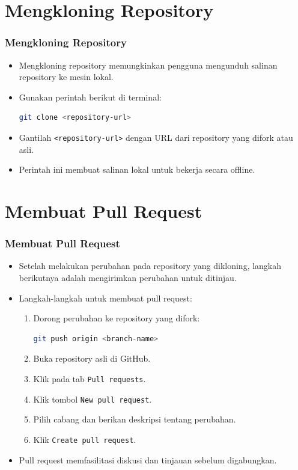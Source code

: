 \documentclass[aspectratio=169, table]{beamer}
\begin{document}
	\section{Mengkloning Repository}
	
	\begin{frame}[fragile]
		\frametitle{Mengkloning Repository}
		\begin{itemize}
			\item Mengkloning repository memungkinkan pengguna mengunduh salinan repository ke mesin lokal.
			\item Gunakan perintah berikut di terminal:
			\begin{lstlisting}[language=bash]
				git clone <repository-url>
			\end{lstlisting}
			\item Gantilah \texttt{<repository-url>} dengan URL dari repository yang difork atau asli.
			\item Perintah ini membuat salinan lokal untuk bekerja secara offline.
		\end{itemize}
	\end{frame}
	
	\section{Membuat Pull Request}
	
	\begin{frame}[fragile]
		\frametitle{Membuat Pull Request}
		\vspace{20pt}
		\begin{itemize}
			\item Setelah melakukan perubahan pada repository yang dikloning, langkah berikutnya adalah mengirimkan perubahan untuk ditinjau.
			\item Langkah-langkah untuk membuat pull request:
			\begin{enumerate}
				\item Dorong perubahan ke repository yang difork:
				\begin{lstlisting}[language=bash]
					git push origin <branch-name>
				\end{lstlisting}
				\item Buka repository asli di GitHub.
				\item Klik pada tab \texttt{Pull requests}.
				\item Klik tombol \texttt{New pull request}.
				\item Pilih cabang dan berikan deskripsi tentang perubahan.
				\item Klik \texttt{Create pull request}.
			\end{enumerate}
			\item Pull request memfasilitasi diskusi dan tinjauan sebelum digabungkan.
		\end{itemize}
	\end{frame}
	
\end{document}
